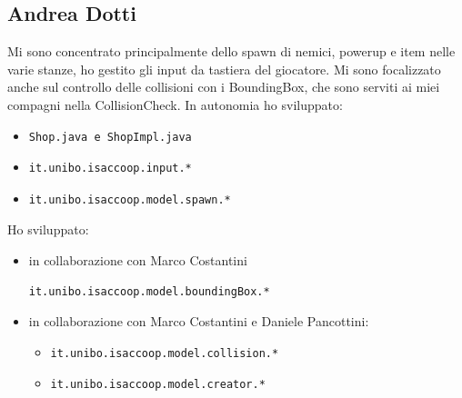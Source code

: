 \documentclass[a4paper,12pt]{report}
\begin{document}
\subsection*{Andrea Dotti}
Mi sono concentrato principalmente dello spawn di nemici, powerup e item nelle varie stanze, ho gestito gli input
da tastiera del giocatore. Mi sono focalizzato anche sul controllo delle collisioni con i BoundingBox, che sono serviti
ai miei compagni nella CollisionCheck.
In autonomia ho sviluppato:
\begin{itemize}
    \item \begin{verbatim}Shop.java e ShopImpl.java \end{verbatim}
    \item \begin{verbatim}it.unibo.isaccoop.input.* \end{verbatim}
    \item \begin{verbatim}it.unibo.isaccoop.model.spawn.* \end{verbatim}
\end{itemize}
Ho sviluppato:
\begin{itemize}
    \item in collaborazione con Marco Costantini \begin{verbatim}it.unibo.isaccoop.model.boundingBox.* \end{verbatim}
    \item in collaborazione con Marco Costantini e Daniele Pancottini:
    \begin{itemize}
        \item \begin{verbatim}it.unibo.isaccoop.model.collision.* \end{verbatim}
        \item \begin{verbatim}it.unibo.isaccoop.model.creator.* \end{verbatim}
    \end{itemize}
\end{itemize}
\end{document}
